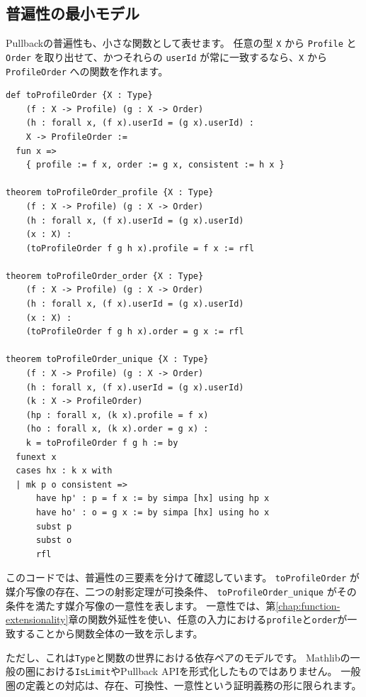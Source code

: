 \subsection{普遍性の最小モデル}

Pullbackの普遍性も、小さな関数として表せます。
任意の型 \texttt{X} から \texttt{Profile} と \texttt{Order} を取り出せて、かつそれらの \texttt{userId} が常に一致するなら、\texttt{X} から \texttt{ProfileOrder} への関数を作れます。

\begin{listing}[htbp]
\begin{verbatim}
def toProfileOrder {X : Type}
    (f : X -> Profile) (g : X -> Order)
    (h : forall x, (f x).userId = (g x).userId) :
    X -> ProfileOrder :=
  fun x =>
    { profile := f x, order := g x, consistent := h x }

theorem toProfileOrder_profile {X : Type}
    (f : X -> Profile) (g : X -> Order)
    (h : forall x, (f x).userId = (g x).userId)
    (x : X) :
    (toProfileOrder f g h x).profile = f x := rfl

theorem toProfileOrder_order {X : Type}
    (f : X -> Profile) (g : X -> Order)
    (h : forall x, (f x).userId = (g x).userId)
    (x : X) :
    (toProfileOrder f g h x).order = g x := rfl

theorem toProfileOrder_unique {X : Type}
    (f : X -> Profile) (g : X -> Order)
    (h : forall x, (f x).userId = (g x).userId)
    (k : X -> ProfileOrder)
    (hp : forall x, (k x).profile = f x)
    (ho : forall x, (k x).order = g x) :
    k = toProfileOrder f g h := by
  funext x
  cases hx : k x with
  | mk p o consistent =>
      have hp' : p = f x := by simpa [hx] using hp x
      have ho' : o = g x := by simpa [hx] using ho x
      subst p
      subst o
      rfl
\end{verbatim}
\caption{\texttt{toProfileOrder}}
\label{lst:ch23-universal-map}
\end{listing}

このコードでは、普遍性の三要素を分けて確認しています。
\texttt{toProfileOrder} が媒介写像の存在、二つの射影定理が可換条件、
\texttt{toProfileOrder\_unique} がその条件を満たす媒介写像の一意性を表します。
一意性では、第\ref{chap:function-extensionality}章の関数外延性を使い、任意の入力における\texttt{profile}と\texttt{order}が一致することから関数全体の一致を示します。

ただし、これは\texttt{Type}と関数の世界における依存ペアのモデルです。
Mathlibの一般の圏における\texttt{IsLimit}やPullback APIを形式化したものではありません。
一般圏の定義との対応は、存在、可換性、一意性という証明義務の形に限られます。

